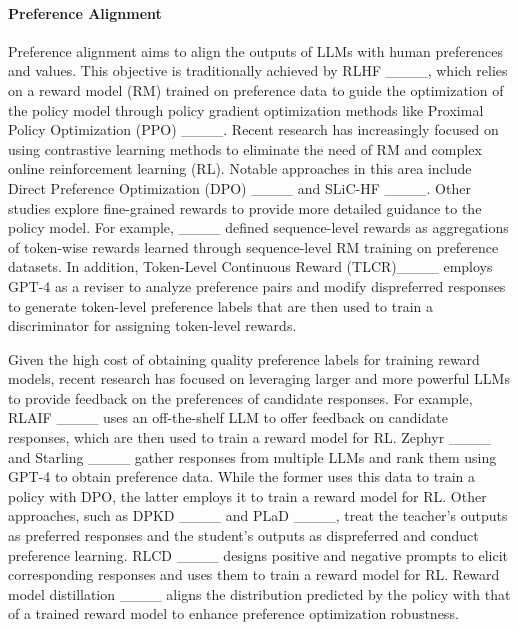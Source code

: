 \paragraph{Preference Alignment}
Preference alignment aims to align the outputs of LLMs with human preferences and values. This objective is traditionally achieved by RLHF ____, which relies on a reward model (RM) trained on preference data to guide the optimization of the policy model through policy gradient optimization methods like Proximal Policy Optimization (PPO) ____. Recent research has increasingly focused on using contrastive learning methods to eliminate the need of RM and complex online reinforcement learning (RL). Notable approaches in this area include Direct Preference Optimization (DPO) ____ and SLiC-HF ____. Other studies explore fine-grained rewards to provide more detailed guidance to the policy model. For example, ____ defined sequence-level rewards as aggregations of token-wise rewards learned through sequence-level RM training on preference datasets. In addition, Token-Level Continuous Reward (TLCR)____ employs GPT-4 as a reviser to analyze preference pairs and modify dispreferred responses to generate token-level preference labels that are then used to train a discriminator for assigning token-level rewards.



Given the high cost of obtaining quality preference labels for training reward models, recent research has focused on leveraging larger and more powerful LLMs to provide feedback on the preferences of candidate responses. For example, RLAIF ____ uses an off-the-shelf LLM to offer feedback on candidate responses, which are then used to train a reward model for RL. Zephyr ____ and Starling ____ gather responses from multiple LLMs and rank them using GPT-4 to obtain preference data. While the former uses this data to train a policy with DPO,  the latter employs it to train a reward model for RL. Other approaches, such as DPKD ____ and PLaD ____, treat the teacher's outputs as preferred responses and the student's outputs as dispreferred and conduct preference learning. RLCD ____ designs positive and negative prompts to elicit corresponding responses and uses them to train a reward model for RL. Reward model distillation ____ aligns the distribution predicted by the policy with that of a trained reward model to enhance preference optimization robustness.

\vspace{-0.5em}